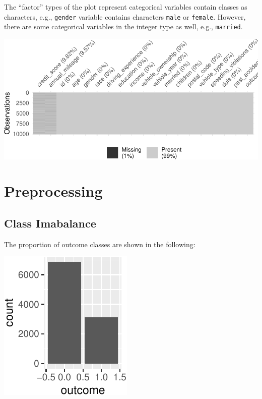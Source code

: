 \documentclass{article}
\begin{document}
The ``factor'' types of the plot represent categorical variables contain
classes as characters, e.g., \texttt{gender} variable contains
characters \texttt{male} or \texttt{female}. However, there are some
categorical variables in the integer type as well, e.g.,
\texttt{married}.

\begin{center}\includegraphics{report_files/figure-latex/unnamed-chunk-4-1} \end{center}

\hypertarget{preprocessing}{%
\section{Preprocessing}\label{preprocessing}}

\hypertarget{class-imabalance}{%
\subsection{\texorpdfstring{Class Imabalance
\label{subsec:imbalance}}{Class Imabalance }}\label{class-imabalance}}

The proportion of outcome classes are shown in the following:

\begin{center}\includegraphics{report_files/figure-latex/unnamed-chunk-6-1} \end{center}
\end{document}

